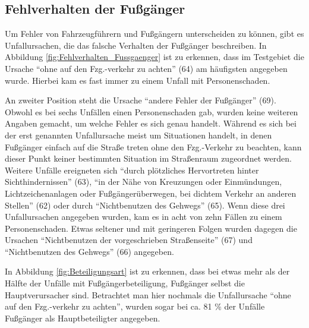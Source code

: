 \subsection{Fehlverhalten der Fußgänger}
Um Fehler von Fahrzeugführern und Fußgängern unterscheiden zu können, gibt es Unfallursachen, die das falsche Verhalten der Fußgänger beschreiben. In Abbildung \ref{fig:Fehlverhalten_Fussgaenger} ist zu erkennen, dass im Testgebiet die Ursache \enquote{ohne auf den Fzg.-verkehr zu achten} (64) am häufigsten angegeben wurde. Hierbei kam es fast immer zu einem Unfall mit Personenschaden.

An zweiter Position steht die Ursache \enquote{andere Fehler der Fußgänger} (69). Obwohl es bei sechs Unfällen einen Personenschaden gab, wurden keine weiteren Angaben gemacht, um welche Fehler es sich genau handelt. Während es sich bei der erst genannten Unfallursache meist um Situationen handelt, in denen Fußgänger einfach auf die Straße treten ohne den Fzg.-Verkehr zu beachten, kann dieser Punkt keiner bestimmten Situation im Straßenraum zugeordnet werden. Weitere Unfälle ereigneten sich \enquote{durch plötzliches Hervortreten hinter Sichthindernissen} (63), \enquote{in der Nähe von Kreuzungen oder Einmündungen, Lichtzeichenanlagen oder Fußgängerüberwegen, bei dichtem Verkehr an anderen Stellen} (62) oder durch \enquote{Nichtbenutzen des Gehwegs} (65). Wenn diese drei Unfallursachen angegeben wurden, kam es in acht von zehn Fällen zu einem Personenschaden. Etwas seltener und mit geringeren Folgen wurden dagegen die Ursachen \enquote{Nichtbenutzen der vorgeschrieben Straßenseite} (67) und \enquote{Nichtbenutzen des Gehwegs} (66) angegeben.

In Abbildung \ref{fig:Beteiligungsart} ist zu erkennen, dass bei etwas mehr als der Hälfte der Unfälle mit Fußgängerbeteiligung, Fußgänger selbst die Hauptverursacher sind. Betrachtet man hier nochmals die Unfallursache \enquote{ohne auf den Fzg.-verkehr zu achten}, wurden sogar bei ca. 81 \% der Unfälle Fußgänger als Hauptbeteiligter angegeben.

